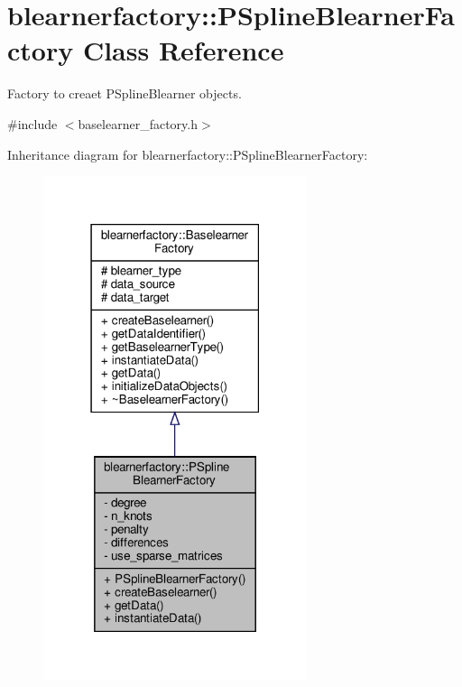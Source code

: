 \hypertarget{classblearnerfactory_1_1_p_spline_blearner_factory}{}\section{blearnerfactory\+:\+:P\+Spline\+Blearner\+Factory Class Reference}
\label{classblearnerfactory_1_1_p_spline_blearner_factory}


Factory to creaet {\ttfamily P\+Spline\+Blearner} objects.  




{\ttfamily \#include $<$baselearner\+\_\+factory.\+h$>$}



Inheritance diagram for blearnerfactory\+:\+:P\+Spline\+Blearner\+Factory\+:
\nopagebreak
\begin{figure}[H]
\begin{center}
\leavevmode
\includegraphics[width=219pt]{classblearnerfactory_1_1_p_spline_blearner_factory__inherit__graph}
\end{center}
\end{figure}


